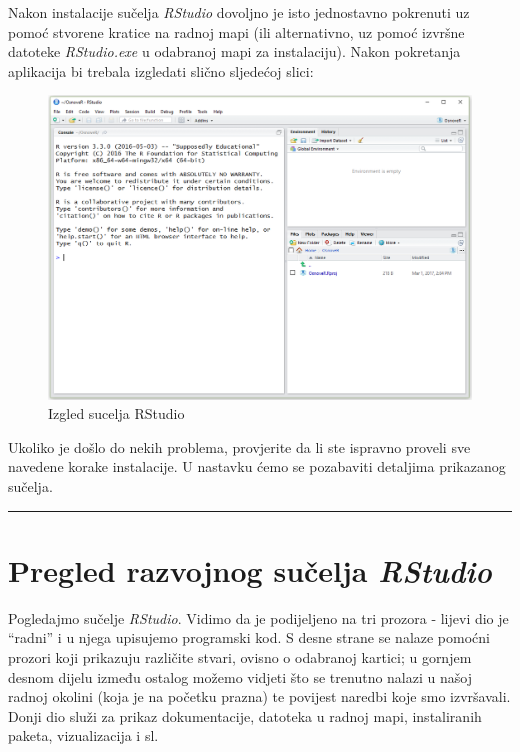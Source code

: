 \documentclass[]{book}
\theoremstyle{definition}
\theoremstyle{definition}
\theoremstyle{definition}
\theoremstyle{remark}
\begin{document}
Nakon instalacije sučelja \emph{RStudio} dovoljno je isto jednostavno
pokrenuti uz pomoć stvorene kratice na radnoj mapi (ili alternativno, uz
pomoć izvršne datoteke \emph{RStudio.exe} u odabranoj mapi za
instalaciju). Nakon pokretanja aplikacija bi trebala izgledati slično
sljedećoj slici:

\begin{figure}
\centering
\includegraphics{figures/RStudio1.png}
\caption{\label{fig:unnamed-chunk-3}Izgled sucelja RStudio}
\end{figure}

Ukoliko je došlo do nekih problema, provjerite da li ste ispravno
proveli sve navedene korake instalacije. U nastavku ćemo se pozabaviti
detaljima prikazanog sučelja.

\begin{center}\rule{0.5\linewidth}{\linethickness}\end{center}

\section{\texorpdfstring{Pregled razvojnog sučelja
\emph{RStudio}}{Pregled razvojnog sučelja RStudio}}\label{pregled-razvojnog-sucelja-rstudio}

Pogledajmo sučelje \emph{RStudio}. Vidimo da je podijeljeno na tri
prozora - lijevi dio je ``radni'' i u njega upisujemo programski kod. S
desne strane se nalaze pomoćni prozori koji prikazuju različite stvari,
ovisno o odabranoj kartici; u gornjem desnom dijelu između ostalog
možemo vidjeti što se trenutno nalazi u našoj radnoj okolini (koja je na
početku prazna) te povijest naredbi koje smo izvršavali. Donji dio služi
za prikaz dokumentacije, datoteka u radnoj mapi, instaliranih paketa,
vizualizacija i sl.
\end{document}
